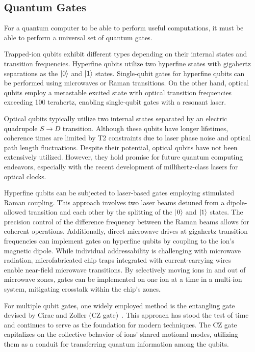 \documentclass[
  journal=largetwo,
  year=2023,
]{cup-journal}
\begin{document}
\subsection{Quantum Gates}
For a quantum computer to be able to perform useful computations, it must be able to perform a universal set of quantum gates.

Trapped-ion qubits exhibit different types depending on their internal states and transition frequencies. Hyperfine qubits utilize two hyperfine states with gigahertz separations as the \(\ket{0}\) and \(\ket{1}\) states. Single-qubit gates for hyperfine qubits can be performed using microwaves or Raman transitions. On the other hand, optical qubits employ a metastable excited state with optical transition frequencies exceeding 100 terahertz, enabling single-qubit gates with a resonant laser.

Optical qubits typically utilize two internal states separated by an electric quadrupole \(S \to D\)  transition. Although these qubits have longer lifetimes, coherence times are limited by T2 constraints due to laser phase noise and optical path length fluctuations. Despite their potential, optical qubits have not been extensively utilized. However, they hold promise for future quantum computing endeavors, especially with the recent development of millihertz-class lasers for optical clocks.

Hyperfine qubits can be subjected to laser-based gates employing stimulated Raman coupling. This approach involves two laser beams detuned from a dipole-allowed transition and each other by the splitting of the \(\ket{0}\) and \(\ket{1}\) states. The precision control of the difference frequency between the Raman beams allows for coherent operations. Additionally, direct microwave drives at gigahertz transition frequencies can implement gates on hyperfine qubits by coupling to the ion's magnetic dipole. While individual addressability is challenging with microwave radiation, microfabricated chip traps integrated with current-carrying wires enable near-field microwave transitions. By selectively moving ions in and out of microwave zones, gates can be implemented on one ion at a time in a multi-ion system, mitigating crosstalk within the chip's zones.


For multiple qubit gates, one widely employed method is the entangling gate devised by Cirac and Zoller (CZ gate)~\autocite{cirac_1995_quantum}. This approach has stood the test of time and continues to serve as the foundation for modern techniques. The CZ gate capitalizes on the collective behavior of ions' shared motional modes, utilizing them as a conduit for transferring quantum information among the qubits.
\end{document}
